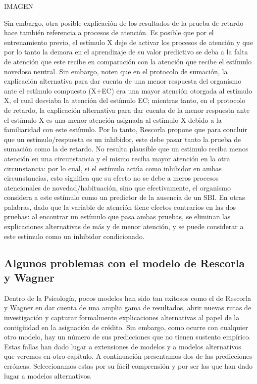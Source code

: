 \documentclass[
  letterpaper,
]{book}
\begin{document}
IMAGEN

Sin embargo, otra posible explicación de los resultados de la prueba de
retardo hace también referencia a procesos de atención. Es posible que
por el entrenamiento previo, el estímulo X deje de activar los procesos
de atención y que por lo tanto la demora en el aprendizaje de su valor
predictivo se deba a la falta de atención que este recibe en comparación
con la atención que recibe el estímulo novedoso neutral. Sin embargo,
noten que en el protocolo de sumación, la explicación alternativa para
dar cuenta de una menor respuesta del organismo ante el estímulo
compuesto (X+EC) era una mayor atención otorgada al estímulo X, el cual
desviaba la atención del estímulo EC; mientras tanto, en el protocolo de
retardo, la explicación alternativa para dar cuenta de la menor
respuesta ante el estímulo X es una menor atención asignada al estímulo
X debido a la familiaridad con este estímulo. Por lo tanto, Rescorla
propone que para concluir que un estímulo/respuesta es un inhibidor,
este debe pasar tanto la prueba de sumación como la de retardo. No
resulta plausible que un estimulo reciba menos atención en una
circunstancia y el mismo reciba mayor atención en la otra circunstancia:
por lo cual, si el estímulo actúa como inhibidor en ambas
circunstancias, esto significa que su efecto no se debe a meros procesos
atencionales de novedad/habituación, sino que efectivamente, el
organismo considera a este estímulo como un predictor de la ausencia de
un SBI. En otras palabras, dado que la variable de atención tiene
efectos contrarios en las dos pruebas: al encontrar un estímulo que pasa
ambas pruebas, se eliminan las explicaciones alternativas de más y de
menor atención, y se puede considerar a este estímulo como un inhibidor
condicionado.

\subsection{Algunos problemas con el modelo de Rescorla y
Wagner}\label{algunos-problemas-con-el-modelo-de-rescorla-y-wagner}

Dentro de la Psicología, pocos modelos han sido tan exitosos como el de
Rescorla y Wagner en dar cuenta de una amplia gama de resultados, abrir
nuevas rutas de investigación y capturar formalmente explicaciones
alternativas al papel de la contigüidad en la asignación de crédito. Sin
embargo, como ocurre con cualquier otro modelo, hay un número de sus
predicciones que no tienen sustento empírico. Estas fallas han dado
lugar a extensiones de modelos y a modelos alternativos que veremos en
otro capítulo. A continuación presentamos dos de las predicciones
erróneas. Seleccionamos estas por su fácil comprensión y por ser las que
han dado lugar a modelos alternativos.
\end{document}

